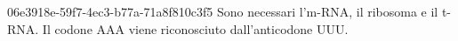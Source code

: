 \documentclass[preview]{standalone}
\begin{document}
\genpage

\begin{snippet}{06e3918e-59f7-4ec3-b77a-71a8f810c3f5}
    Sono necessari l'm-RNA, il ribosoma e il t-RNA.
    Il codone AAA viene riconosciuto dall'anticodone UUU.
\end{snippet}
\end{document}
